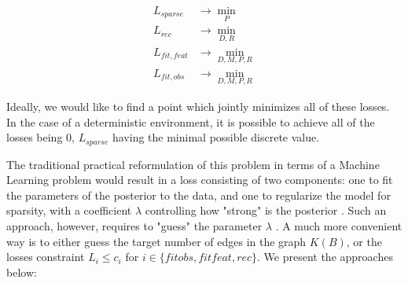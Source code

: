 \documentclass[a4paper,11pt,oneside]{report}
\begin{document}
\begin{equation}
\label{eq:all_losses}
\begin{array}{lc}
L_{sparse}&\to\min\limits_P\\
L_{rec}&\to\min\limits_{D,R}\\
L_{fit, feat}&\to\min\limits_{D,M,P,R}\\
L_{fit, obs}&\to\min\limits_{D,M,P,R}
\end{array}
\end{equation}

Ideally, we would like to find a point which jointly minimizes all of these losses. In the case of a deterministic environment, it is possible to achieve all of the losses being $0$, $L_{sparse}$ having the minimal possible discrete value.

The traditional practical reformulation of this problem in terms of a Machine Learning problem would result in a loss consisting of two components: one to fit the parameters of the posterior to the data, and one to regularize the model for sparsity, with a coefficient $\lambda$ controlling how "strong" is the posterior \cite{Seeger2007}.
Such an approach, however, requires to "guess" the parameter $\lambda$ \cite{Luneau2020,Wang2020}.
A much more convenient way is to either guess the target number of edges in the graph $K(B)$, or the losses constraint $L_i\leq c_i$ for $i\in\{fitobs, fitfeat, rec\}$.
We present the approaches below:
\end{document}
